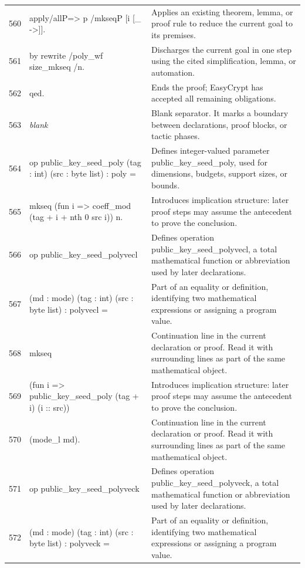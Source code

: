 \documentclass[10pt]{article}
\begin{document}
\begin{longtable}{r L{0.53\textwidth} L{0.37\textwidth}}
560 & {\ttfamily\scriptsize apply/allP=> p /mkseqP [i [\_ ->]].} & Applies an existing theorem, lemma, or proof rule to reduce the current goal to its premises. \\
561 & {\ttfamily\scriptsize by rewrite /poly\_wf size\_mkseq /n.} & Discharges the current goal in one step using the cited simplification, lemma, or automation. \\
562 & {\ttfamily\scriptsize qed.} & Ends the proof; EasyCrypt has accepted all remaining obligations. \\
563 & {\ttfamily\scriptsize \emph{blank}} & Blank separator.  It marks a boundary between declarations, proof blocks, or tactic phases. \\
564 & {\ttfamily\scriptsize op public\_key\_seed\_poly (tag : int) (src : byte list) : poly =} & Defines integer-valued parameter public\_key\_seed\_poly, used for dimensions, budgets, support sizes, or bounds. \\
565 & {\ttfamily\scriptsize   mkseq (fun i => coeff\_mod (tag + i + nth 0 src i)) n.} & Introduces implication structure: later proof steps may assume the antecedent to prove the conclusion. \\
566 & {\ttfamily\scriptsize op public\_key\_seed\_polyvecl} & Defines operation public\_key\_seed\_polyvecl, a total mathematical function or abbreviation used by later declarations. \\
567 & {\ttfamily\scriptsize    (md : mode) (tag : int) (src : byte list) : polyvecl =} & Part of an equality or definition, identifying two mathematical expressions or assigning a program value. \\
568 & {\ttfamily\scriptsize   mkseq} & Continuation line in the current declaration or proof.  Read it with surrounding lines as part of the same mathematical object. \\
569 & {\ttfamily\scriptsize     (fun i => public\_key\_seed\_poly (tag + i) (i :: src))} & Introduces implication structure: later proof steps may assume the antecedent to prove the conclusion. \\
570 & {\ttfamily\scriptsize     (mode\_l md).} & Continuation line in the current declaration or proof.  Read it with surrounding lines as part of the same mathematical object. \\
571 & {\ttfamily\scriptsize op public\_key\_seed\_polyveck} & Defines operation public\_key\_seed\_polyveck, a total mathematical function or abbreviation used by later declarations. \\
572 & {\ttfamily\scriptsize    (md : mode) (tag : int) (src : byte list) : polyveck =} & Part of an equality or definition, identifying two mathematical expressions or assigning a program value. \\

\end{longtable}
\end{document}
